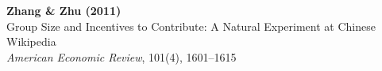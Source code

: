 \documentclass[12pt]{article}
\begin{document}
\begin{center}
{\Large\bfseries Zhang \& Zhu (2011)}\\
{\large Group Size and Incentives to Contribute:
A Natural Experiment at Chinese Wikipedia}\\
\vspace{0.5em}
{\normalsize \textit{American Economic Review}, 101(4), 1601--1615}
\end{center}

\vspace{1em}



\clearpage


\end{document}
